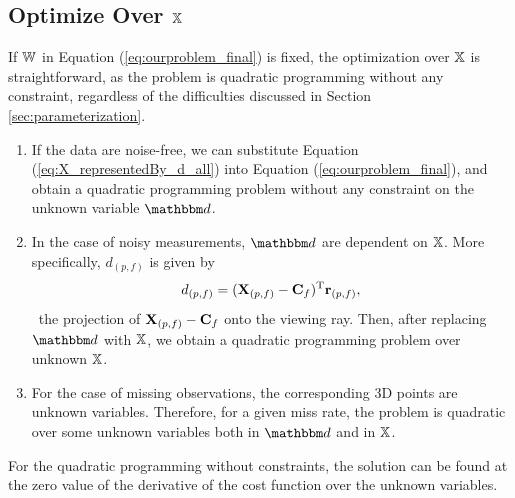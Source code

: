 \subsection{Optimize Over $\mathbb X$} \label{sec:optimize_over_x}
If $\mathbb W$ in Equation (\ref{eq:ourproblem_final}) is fixed, the optimization over $\mathbb X$ is straightforward, as the problem is quadratic programming without any constraint, regardless of the difficulties discussed in Section \ref{sec:parameterization}.
\begin{enumerate}%
\item {If the data are noise-free,
we can substitute Equation (\ref{eq:X_representedBy_d_all}) into Equation (\ref{eq:ourproblem_final}),
and obtain a quadratic programming problem without any constraint on the unknown variable $\alld$. }
\item{
In the case of noisy measurements, $\alld$ are dependent on $\mathbb X$. More specifically, $d_{(p,f)}$ is given by
\begin{equation}
d_{(p,f)}=(\mathbf X_{(p,f)}-\mathbf{C}_{f})^\text{T}\mathbf{r}_{(p,f)}, 
\end{equation}
\ie~the projection of $\mathbf X_{(p,f)}-\mathbf{C}_{f}$ onto the viewing ray. Then, after replacing $\alld$ with $\mathbb X$, we obtain a quadratic programming problem over unknown $\mathbb X$.
}
\item{ For the case of missing observations, the corresponding 3D points are unknown variables. Therefore, for a given miss rate, the problem is quadratic over some unknown variables both in $\alld$ and in $\mathbb X$.
}
\end{enumerate}
For the quadratic programming without constraints, the solution can be found at the zero value of the derivative of the cost function over the unknown variables.

